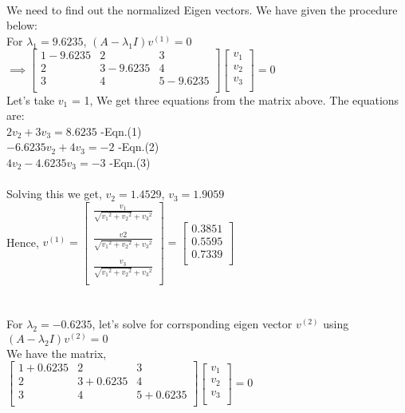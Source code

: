 \documentclass{article}
\begin{document}
\\
We need to find out the normalized Eigen vectors.
We have given the procedure below:\\
For ${\lambda}_1 = 9.6235$,
$(A - {{\lambda}_1}I)v^{(1)} = 0$\\
$\implies \begin{bmatrix}
1 - 9.6235   &     2&       3\\
   2  &  3 - 9.6235    &    4\\
    3  &  4 &   5 - 9.6235 \\
\end{bmatrix}\begin{bmatrix}
v_1 \\
   v_2\\
    v_3 \\
\end{bmatrix} = 0$\\
Let's take $v_1$ = 1, 
We get three equations from the matrix above. The equations are:\\
$2v_2 + 3v_3 = 8.6235$ -Eqn.(1)\\
$-6.6235v_2 + 4v_3 = -2$ -Eqn.(2)\\
$4v_2 - 4.6235v_3 = -3$ -Eqn.(3)\\
\\
Solving this we get, $v_2 = 1.4529$, $v_3 = 1.9059$ \\
Hence, 
$v^{(1)} =  \begin{bmatrix}
\frac{v_1}{\sqrt{{v_1}^2 + {v_2}^2} + {v_3}^2} \\
\\
   \frac{v2}{\sqrt{{v_1}^2 + {v_2}^2} + {v_3}^2}\\
\\
    \frac{v_3}{\sqrt{{v_1}^2 + {v_2}^2} + {v_3}^2} \\
\end{bmatrix} = \begin{bmatrix}
0.3851 \\
  0.5595\\
    0.7339 \\
\end{bmatrix}$\\
\\
\\
For ${\lambda}_2 = -0.6235$, let's solve for corrsponding eigen vector $v^{(2)}$ using $(A - {{\lambda}_2}I)v^{(2)} = 0$\\We have the matrix,\\
$\begin{bmatrix}
1 + 0.6235   &     2&       3\\
   2  &  3 + 0.6235    &    4\\
    3  &  4 &   5 + 0.6235 \\
\end{bmatrix}\begin{bmatrix}
v_1 \\
   v_2\\
    v_3 \\
\end{bmatrix} = 0$\\
\end{document}
